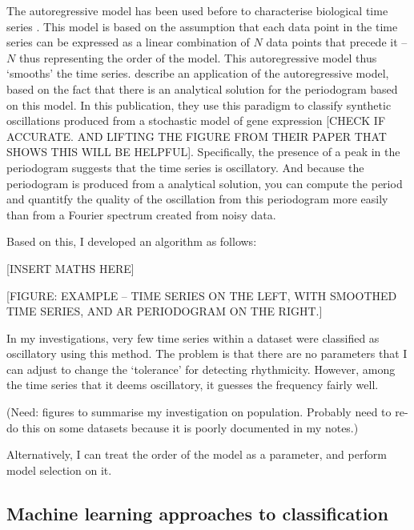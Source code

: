 The autoregressive model has been used before to characterise biological time series \parencite{zielinskiStrengthsLimitationsPeriod2014}.
This model is based on the assumption that each data point in the time series can be expressed as a linear combination of $N$ data points that precede it -- $N$ thus representing the order of the model.
This autoregressive model thus `smooths' the time series.
\parencite{jiaFrequencyDomainAnalysis2021} describe an application of the autoregressive model, based on the fact that there is an analytical solution for the periodogram based on this model.
In this publication, they use this paradigm to classify synthetic oscillations produced from a stochastic model of gene expression [CHECK IF ACCURATE.  AND LIFTING THE FIGURE FROM THEIR PAPER THAT SHOWS THIS WILL BE HELPFUL].
Specifically, the presence of a peak in the periodogram suggests that the time series is oscillatory.
And because the periodogram is produced from a analytical solution, you can compute the period and quantitfy the quality of the oscillation from this periodogram more easily than from a Fourier spectrum created from noisy data.

Based on this, I developed an algorithm as follows:

[INSERT MATHS HERE]

[FIGURE: EXAMPLE -- TIME SERIES ON THE LEFT, WITH SMOOTHED TIME SERIES, AND AR PERIODOGRAM ON THE RIGHT.]

In my investigations, very few time series within a dataset were classified as oscillatory using this method.
The problem is that there are no parameters that I can adjust to change the `tolerance' for detecting rhythmicity.
However, among the time series that it deems oscillatory, it guesses the frequency fairly well.

(Need: figures to summarise my investigation on population.  Probably need to re-do this on some datasets because it is poorly documented in my notes.)

Alternatively, I can treat the order of the model as a parameter, and perform model selection on it.

\subsection{Machine learning approaches to classification}
\label{subsec:analysis-classification-ml}

